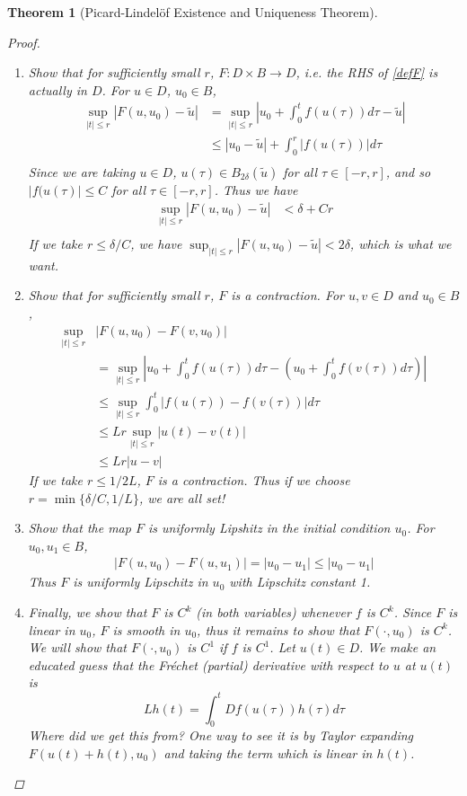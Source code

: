 \documentclass[10pt]{article}         %
\newtheorem{theorem}{Theorem}[section]
\theoremstyle{remark}
\begin{document}
\begin{theorem}[Picard-Lindel\"{o}f Existence and Uniqueness Theorem]
\begin{proof}
\begin{enumerate}
\item Show that for sufficiently small $r$, $F: D \times B \rightarrow D$, i.e. the RHS of \eqref{defF} is actually in $D$. For $u \in D$, $u_0 \in B$,
\begin{align*}
\sup_{|t| \leq r} |F(u, u_0) - \tilde{u}| &= 
\sup_{|t| \leq r} \left|u_0 + \int_0^t f(u(\tau)) d\tau - \tilde{u}\right| \\
&\leq |u_0 - \tilde{u}| + \int_0^r |f(u(\tau))| d \tau \\
\end{align*}
Since we are taking $u \in D$, $u(\tau) \in B_{2 \delta}(\tilde{u})$ for all $\tau \in [-r, r]$, and so $|f(u(\tau)| \leq C$ for all $\tau \in [-r, r]$. Thus we have
\begin{align*}
\sup_{|t| \leq r} |F(u, u_0) - \tilde{u}|
&< \delta + C r \\
\end{align*}
If we take $r \leq \delta/C$, we have $\sup_{|t| \leq r} |F(u, u_0) - \tilde{u}| < 2 \delta$, which is what we want.

\item Show that for sufficiently small $r$, $F$ is a contraction. For $u, v \in D$ and $u_0 \in B$, 
\begin{align*}
\sup_{|t|\leq r}&|F(u, u_0) - F(v, u_0)| \\
&=\sup_{|t|\leq r} \left| u_0 + \int_0^t f(u(\tau)) d \tau - \left(u_0 + \int_0^t f(v(\tau)) d \tau \right) \right| \\
&\leq \sup_{|t|\leq r} \int_0^t | f(u(\tau)) - f(v(\tau))| d \tau \\
&\leq L r \sup_{|t|\leq r} |u(t) - v(t)| \\
&\leq L r |u - v|
\end{align*}
If we take $r \leq 1/2L$, $F$ is a contraction. Thus if we choose $r = \min\{ \delta/C, 1/L\}$, we are all set!

\item Show that the map $F$ is uniformly Lipshitz in the initial condition $u_0$. For $u_0, u_1 \in B$,
\begin{align*}
|F(u, u_0) - F(u, u_1)| = |u_0 - u_1| \leq |u_0 - u_1|
\end{align*} 
Thus $F$ is uniformly Lipschitz in $u_0$ with Lipschitz constant 1.

\item Finally, we show that $F$ is $C^k$ (in both variables) whenever $f$ is $C^k$. Since $F$ is linear in $u_0$, $F$ is smooth in $u_0$, thus it remains to show that $F(\cdot, u_0)$ is $C^k$. We will show that $F(\cdot, u_0)$ is $C^1$ if $f$ is $C^1$. Let $u(t) \in D$. We make an educated guess that the Fr\'{e}chet (partial) derivative with respect to $u$ at $u(t)$ is 
\[
L h(t) = \int_0^t Df(u(\tau)) h(\tau) d \tau
\]
Where did we get this from? One way to see it is by Taylor expanding $F(u(t) + h(t), u_0)$ and taking the term which is linear in $h(t)$. 


\end{enumerate}
\end{proof}
\end{theorem}
\end{document}
